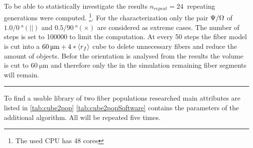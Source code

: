 % 
% 
To be able to statistically investigate the results $n_{\mathit{repeat}} = \SI{24}{}$ repeating generations were computed. \footnote{The used CPU has 48 cores}.
For the characterization only the pair $\textnormal{$\Psi$}/\textnormal{$\Omega$}$ of $1.0/\SI{0}{\degree} (||)$ and $0.5/\SI{90}{\degree} (\times)$ are considered as extreme cases.
The number of steps is set to \SI{100000}{} to limit the computation.
% 
At every 50 steps the fiber model is cut into a $\SI{60}{\micro\meter}+4*\fiberRadiusMean$ cube to delete unnecessary fibers and reduce the amount of objects.
Befor the orientation is analysed from the results the volume is cut to $\SI{60}{\micro\meter}$ and therefore only the in the simulation remaining fiber segments will remain.
% 
% 
\par
\noindent\rule{\textwidth}{2pt}
\par
% 
To find a usable library of two fiber populations researched main attributes are listed in \cref{tab:cube2pop} \cref{tab:cube2popSoftware} contains the parameters of the additional  algorithm. All \dummy{} will be repeated five times.
% 
% 
